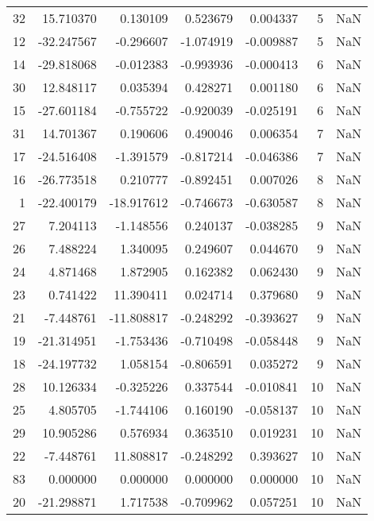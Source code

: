 \begin{tabular}{rrrrrrr}
32 &  15.710370 &   0.130109 &  0.523679 &    0.004337 &           5 & NaN \\
12 & -32.247567 &  -0.296607 & -1.074919 &   -0.009887 &           5 & NaN \\
14 & -29.818068 &  -0.012383 & -0.993936 &   -0.000413 &           6 & NaN \\
30 &  12.848117 &   0.035394 &  0.428271 &    0.001180 &           6 & NaN \\
15 & -27.601184 &  -0.755722 & -0.920039 &   -0.025191 &           6 & NaN \\
31 &  14.701367 &   0.190606 &  0.490046 &    0.006354 &           7 & NaN \\
17 & -24.516408 &  -1.391579 & -0.817214 &   -0.046386 &           7 & NaN \\
16 & -26.773518 &   0.210777 & -0.892451 &    0.007026 &           8 & NaN \\
 1 & -22.400179 & -18.917612 & -0.746673 &   -0.630587 &           8 & NaN \\
27 &   7.204113 &  -1.148556 &  0.240137 &   -0.038285 &           9 & NaN \\
26 &   7.488224 &   1.340095 &  0.249607 &    0.044670 &           9 & NaN \\
24 &   4.871468 &   1.872905 &  0.162382 &    0.062430 &           9 & NaN \\
23 &   0.741422 &  11.390411 &  0.024714 &    0.379680 &           9 & NaN \\
21 &  -7.448761 & -11.808817 & -0.248292 &   -0.393627 &           9 & NaN \\
19 & -21.314951 &  -1.753436 & -0.710498 &   -0.058448 &           9 & NaN \\
18 & -24.197732 &   1.058154 & -0.806591 &    0.035272 &           9 & NaN \\
28 &  10.126334 &  -0.325226 &  0.337544 &   -0.010841 &          10 & NaN \\
25 &   4.805705 &  -1.744106 &  0.160190 &   -0.058137 &          10 & NaN \\
29 &  10.905286 &   0.576934 &  0.363510 &    0.019231 &          10 & NaN \\
22 &  -7.448761 &  11.808817 & -0.248292 &    0.393627 &          10 & NaN \\
83 &   0.000000 &   0.000000 &  0.000000 &    0.000000 &          10 & NaN \\
20 & -21.298871 &   1.717538 & -0.709962 &    0.057251 &          10 & NaN \\
\bottomrule
\end{tabular}
